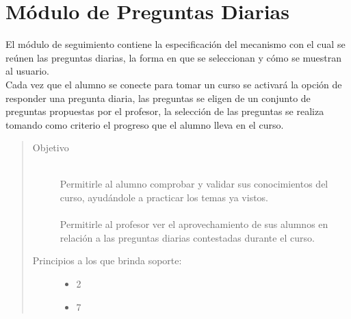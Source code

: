 \chapter{Módulo de Preguntas Diarias}
\label{mod:seguimiento}

    El módulo de seguimiento contiene la especificación del mecanismo con el cual se reúnen las preguntas diarias, la forma en que se seleccionan y cómo se muestran al usuario.\\


    \noindent Cada vez que el alumno se conecte para tomar un curso se activará la opción de responder una pregunta diaria, las preguntas se eligen de un conjunto de preguntas propuestas por el profesor, la selección de las preguntas se realiza tomando como criterio el progreso que el alumno lleva en el curso.
    
    \begin{quote}
    \begin{description}
        \item[Objetivo] \hfill\\
            Permitirle al alumno comprobar y validar sus conocimientos del curso, ayudándole a practicar los temas ya vistos.\\\\
            Permitirle al profesor ver el aprovechamiento de sus alumnos en relación a las preguntas diarias contestadas durante el curso.
        \item[Principios a los que brinda soporte:] \hfill
            \begin{itemize}
                \item 2 \principioII
                \item 7 \principioVII
            \end{itemize}
    \end{description}
    \end{quote}